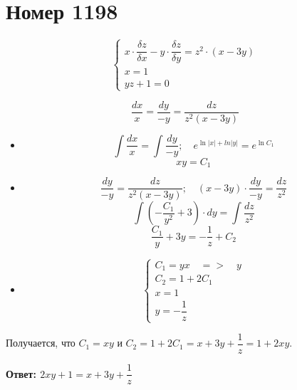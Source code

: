 \section*{Номер 1198}

$$
    \begin{cases}
        x \cdot \dfrac{\delta z}{\delta x} - y \cdot \dfrac{\delta z}{\delta y} = z^2 \cdot (x - 3y) \\
        x = 1                                                                                        \\
        yz + 1 = 0
    \end{cases}
$$

\begin{solution}
    $$ \dfrac{dx}{x} = \dfrac{dy}{-y} = \dfrac{dz}{z^2 (x - 3y)} $$
    \begin{itemize}
        \item
              $$ \int \dfrac{dx}{x} = \int \dfrac{dy}{-y}; \quad e^{\ln|x| + ln|y|} = e^{\ln C_1} $$
              $$ xy = C_1 $$
        \item
              $$ \dfrac{dy}{-y} = \dfrac{dz}{z^2 (x - 3y)}; \quad (x - 3y) \cdot \dfrac{dy}{-y} = \dfrac{dz}{z^2} $$
              $$ \int (-\dfrac{C_1}{y^2} + 3) \cdot dy = \int \dfrac{dz}{z^2} $$
              $$ \dfrac{C_1}{y} + 3y = - \dfrac{1}{z} + C_2 $$
        \item
              $$
                  \begin{cases}
                      C_1 = yx \quad=>\quad y \\
                      C_2 = 1 + 2 C_1         \\
                      x = 1                   \\
                      y = - \dfrac{1}{z}
                  \end{cases}
              $$
    \end{itemize}
    Получается, что $ C_1 = xy $ и $ C_2 = 1 + 2C_1 = x + 3y + \dfrac{1}{z} = 1 + 2xy $. \par
    \textbf{Ответ: $ 2xy + 1 = x + 3y + \dfrac{1}{z} $}

\end{solution}\pagebreak


